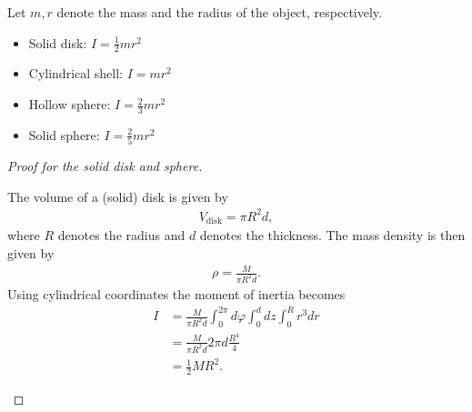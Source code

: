     \begin{example}
        Let $m,r$ denote the mass and the radius of the object, respectively.
        \begin{itemize}
            \item Solid disk: $I = \frac{1}{2}mr^2$
            \item Cylindrical shell: $I = mr^2$
            \item Hollow sphere: $I = \frac{2}{3}mr^2$
            \item Solid sphere: $I = \frac{2}{5}mr^2$\newline
        \end{itemize}

        \begin{proof}[Proof for the solid disk and sphere]
            \begin{mdframed}[roundcorner=10pt, linecolor=blue, linewidth=1pt]
                The volume of a (solid) disk is given by
                \begin{gather}
                    V_\mathrm{disk} = \pi R^2d,
                \end{gather}
                where $R$ denotes the radius and $d$ denotes the thickness. The mass density is then given by
                \begin{gather}
                    \rho = \frac{M}{\pi R^2d}.
                \end{gather}
                Using cylindrical coordinates the moment of inertia becomes
                \begin{align}
                    I &= \frac{M}{\pi R^2d}\int_0^{2\pi}d\varphi\int_0^ddz\int_0^Rr^3dr\nonumber\\
                    &= \frac{M}{\pi R^2d}2\pi d\frac{R^4}{4}\nonumber\\
                    &= \frac{1}{2}MR^2.
                \end{align}


\end{mdframed}
\end{proof}
\end{example}
